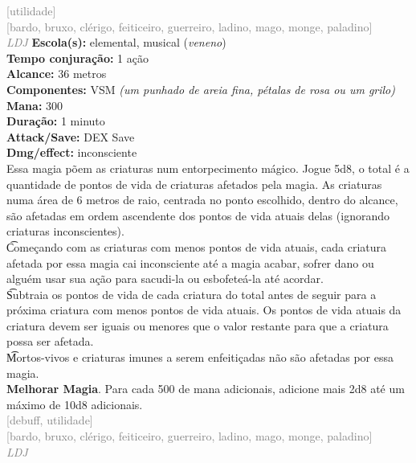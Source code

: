 \documentclass{RPG_Adventure}[2021/10/20]
\begin{document}
{\scriptsize \textcolor{gray}{[utilidade]\\}}
{\scriptsize \textcolor{gray}{[bardo, bruxo, clérigo, feiticeiro, guerreiro, ladino, mago, monge, paladino]\\}}
{\tiny \textcolor{gray}{\textit{LDJ}}}
{\small \t \textbf{Escola(s):} elemental, musical (\textit{veneno})\\\t \textbf{Tempo conjuração:} 1 ação\\\t \textbf{Alcance:} 36 metros\\\t \textbf{Componentes:} VSM \textit{(um punhado de areia fina, pétalas de rosa ou um grilo)}\\\t \textbf{Mana:} 300\\\t \textbf{Duração:} 1 minuto\\\t \textbf{Attack/Save:} DEX Save\\\t \textbf{Dmg/effect:} inconsciente\\}
{\normalsize Essa magia põem as criaturas num entorpecimento mágico. Jogue 5d8, o total é a quantidade de pontos de vida de criaturas afetados pela magia. As criaturas numa área de 6 metros de raio, centrada no ponto escolhido, dentro do alcance, são afetadas em ordem ascendente dos pontos de vida atuais delas (ignorando criaturas inconscientes).\\\t Começando com as criaturas com menos pontos de vida atuais, cada criatura afetada por essa magia cai inconsciente até a magia acabar, sofrer dano ou alguém usar sua ação para sacudi-la ou esbofeteá-la até acordar.\\\t Subtraia os pontos de vida de cada criatura do total antes de seguir para a próxima criatura com menos pontos de vida atuais. Os pontos de vida atuais da criatura devem ser iguais ou menores que o valor restante para que a criatura possa ser afetada.\\\t Mortos-vivos e criaturas imunes a serem enfeitiçadas não são afetadas por essa magia.\\\t \textbf{Melhorar Magia}. Para cada 500 de mana adicionais, adicione mais 2d8 até um máximo de 10d8 adicionais.\\}
{\scriptsize \textcolor{gray}{[debuff, utilidade]\\}}
{\scriptsize \textcolor{gray}{[bardo, bruxo, clérigo, feiticeiro, guerreiro, ladino, mago, monge, paladino]\\}}
{\tiny \textcolor{gray}{\textit{LDJ}}}
\end{document}

